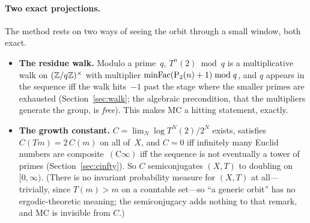 \paragraph{Two exact projections.}
The method rests on two ways of seeing the orbit through a small window,
both exact.
\begin{itemize}[nosep]
\item \textbf{The residue walk.}  Modulo a prime~$q$, $T^{n}(2) \bmod q$
  is a multiplicative walk on $(\mathbb{Z}/q\mathbb{Z})^\times$ with multiplier
  $\mathrm{minFac}(\mathrm{P}_{2}(n)+1) \bmod q$, and $q$ appears in the sequence iff the
  walk hits~$-1$ past the stage where the smaller primes are exhausted
  (Section~\ref{sec:walk}; the algebraic precondition, that the
  multipliers generate the group, is \emph{free}).  This makes MC a
  hitting statement, exactly.
\item \textbf{The growth constant.}  $C = \lim_N \log T^{N}(2)/2^{N}$
  exists, satisfies $C(Tm) = 2\,C(m)$ on all of~$X$, and
  $C = 0$ iff infinitely many Euclid numbers are composite~$(\mathrm{C}\infty)$
  iff the sequence is not eventually a tower of primes
  (Section~\ref{sec:cinfty}).  So $C$ semiconjugates $(X,T)$ to doubling
  on $[0,\infty)$.  (There is no invariant probability measure for
  $(X,T)$ at all---trivially, since $T(m) > m$ on a countable set---so
  ``a generic orbit'' has no ergodic-theoretic meaning; the semiconjugacy
  adds nothing to that remark, and MC is invisible from $C$.)
\end{itemize}

